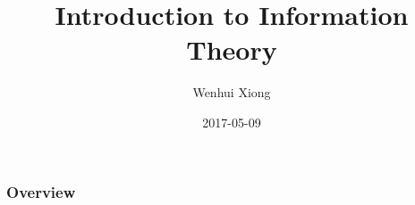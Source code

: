 \documentclass[slidestop, compress, matherif]{beamer}
\title{Introduction to Information Theory}
\author{Wenhui Xiong}
\institute{NCL UESTC}
\date{2017-05-09}
\begin{document}
	\begin{frame}
		\titlepage
	\end{frame}

	\begin{frame}
		\frametitle{Overview}
		\tableofcontents
	\end{frame}
\end{document}
